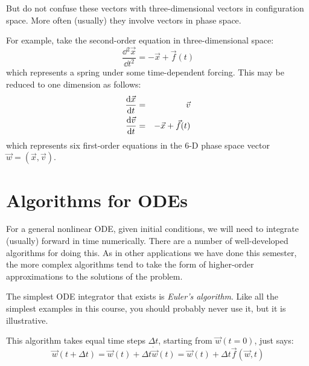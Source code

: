But do not confuse these vectors with three-dimensional vectors in
configuration space. More often (usually) they involve vectors in
phase space.

For example, take the second-order equation in three-dimensional space:
\begin{equation}
\frac{\dd{^2\vec{x}}}{\dd{t}^2} = - \vec{x} + \vec{f}(t)
\end{equation}
which represents a spring under some time-dependent forcing. This may
be reduced to one dimension as follows:
\begin{eqnarray}
\frac{{\rm d}\vec{x}}{{\rm d}t} &=& \vec{v} \cr
\frac{{\rm d}\vec{v}}{{\rm d}t} &=& - \vec{x} + \vec{f}(t)
\end{eqnarray}
which represents six first-order equations in the 6-D phase space
vector $\vec{w} = (\vec{x}, \vec{v})$.

\section{Algorithms for ODEs}

For a general nonlinear ODE, given initial conditions, we will need to
integrate (usually) forward in time numerically. There are a number of
well-developed algorithms for doing this. As in other applications we
have done this semester, the more complex algorithms tend to take the
form of higher-order approximations to the solutions of the problem. 

The simplest ODE integrator that exists is {\it Euler's algorithm}.
Like all the simplest examples in this course, you should probably
never use it, but it is illustrative.

This algorithm takes equal time steps $\Delta t$, starting from
$\vec{w}(t=0)$, just says:
\begin{equation}
\vec{w}(t+\Delta t) = \vec{w}(t) + \Delta t {\dot{\vec{w}}}(t) = 
\vec{w}(t) + \Delta t \vec{f}(\vec{w}, t)
\end{equation}



